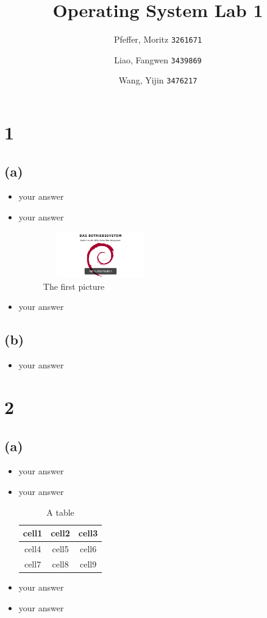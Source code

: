 \documentclass[a4paper]{article}
\title{Operating System Lab 1}
\author{
	Pfeffer, Moritz 
	\texttt{3261671}
	\and
	Liao, Fangwen
	\texttt{3439869}
	\and
	Wang, Yijin
	\texttt{3476217}
}
\begin{document}
	\maketitle
	\section*{1}
	\subsection*{(a)}
	\begin{itemize}
		\item{your answer}
		\item{your answer}
			\begin{figure}[h]
				\centering
				\includegraphics[width=5cm, height=2cm]{screenshot0.png}
				\caption{The first picture}
			\end{figure}
		\item{your answer}
		
	\end{itemize}

	\subsection*{(b)}
	\begin{itemize}
		\item{your answer}
	\end{itemize}
	
	\section*{2}
	\subsection*{(a)}
	\begin{itemize}
		\item{your answer}
		\item{your answer}
			\begin{table}[h]
				\centering
				\begin{tabular}[h]{|c|c|c|}
					\hline
					cell1 & cell2 & cell3 \\ 
					\hline
					cell4 & cell5 & cell6 \\  
					\hline
					cell7 & cell8 & cell9 \\   
					\hline
				\end{tabular}
				\caption{A table}
			\end{table}
		
		\item{your answer}
		\item{your answer}
		
	\end{itemize}
	\begin{center}
		
	\end{center}
\end{document}
